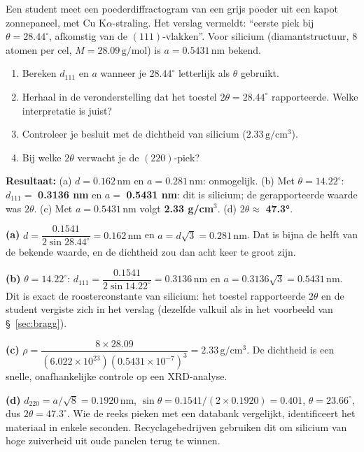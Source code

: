 \begin{oefening}
Een student meet een poederdiffractogram van een grijs poeder uit een kapot zonnepaneel, met Cu K\(\alpha\)-straling. Het verslag vermeldt: ``eerste piek bij \(\theta = 28.44^\circ\), afkomstig van de \((111)\)-vlakken''. Voor silicium (diamantstructuur, 8 atomen per cel, \(M = 28.09\,\mathrm{g/mol}\)) is \(a = 0.5431\,\mathrm{nm}\) bekend.

\begin{enumerate}
\item[(a)]
  Bereken \(d_{111}\) en \(a\) wanneer je \(28.44^\circ\) letterlijk als \(\theta\) gebruikt.
\item[(b)]
  Herhaal in de veronderstelling dat het toestel \(2\theta = 28.44^\circ\) rapporteerde. Welke interpretatie is juist?
\item[(c)]
  Controleer je besluit met de dichtheid van silicium (\(2.33\,\mathrm{g/cm^3}\)).
\item[(d)]
  Bij welke \(2\theta\) verwacht je de \((220)\)-piek?
\end{enumerate}
\end{oefening}
\begin{oplossing}
\textbf{Resultaat:} (a) \(d = 0.162\,\mathrm{nm}\) en \(a = 0.281\,\mathrm{nm}\): onmogelijk. (b) Met \(\theta = 14.22^\circ\): \(d_{111} =\) \textbf{0.3136 nm} en \(a =\) \textbf{0.5431 nm}: dit is silicium; de gerapporteerde waarde was \(2\theta\). (c) Met \(a = 0.5431\,\mathrm{nm}\) volgt \textbf{2.33 g/cm\ensuremath{^{3}}}. (d) \(2\theta \approx\) \textbf{47.3°}.

\textbf{(a)} \(d = \dfrac{0.1541}{2\sin 28.44^\circ} = 0.162\,\mathrm{nm}\) en \(a = d\sqrt{3} = 0.281\,\mathrm{nm}\). Dat is bijna de helft van de bekende waarde, en de dichtheid zou dan acht keer te groot zijn.

\textbf{(b)} \(\theta = 14.22^\circ\): \(d_{111} = \dfrac{0.1541}{2\sin 14.22^\circ} = 0.3136\,\mathrm{nm}\) en \(a = 0.3136\sqrt{3} = 0.5431\,\mathrm{nm}\). Dit is exact de roosterconstante van silicium: het toestel rapporteerde \(2\theta\) en de student vergiste zich in het verslag (dezelfde valkuil als in het voorbeeld van \S~\ref{sec:bragg}).

\textbf{(c)} \(\rho = \dfrac{8 \times 28.09}{(6.022\times10^{23})(0.5431\times10^{-7})^3} = 2.33\,\mathrm{g/cm^3}\). De dichtheid is een snelle, onafhankelijke controle op een XRD-analyse.

\textbf{(d)} \(d_{220} = a/\sqrt{8} = 0.1920\,\mathrm{nm}\), \(\sin\theta = 0.1541/(2 \times 0.1920) = 0.401\), \(\theta = 23.66^\circ\), dus \(2\theta = 47.3^\circ\). Wie de reeks pieken met een databank vergelijkt, identificeert het materiaal in enkele seconden. Recyclagebedrijven gebruiken dit om silicium van hoge zuiverheid uit oude panelen terug te winnen.
\end{oplossing}


